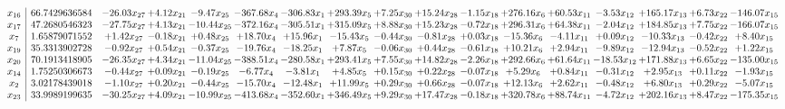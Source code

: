 \documentclass[9pt]{article}
\begin{document}
 \[\begin{array}{c| c c@{\hskip 2pt} c@{\hskip 2pt} c@{\hskip 2pt} c@{\hskip 2pt} c@{\hskip 2pt} c@{\hskip 2pt} c@{\hskip 2pt} c@{\hskip 2pt} c@{\hskip 2pt} c@{\hskip 2pt} c@{\hskip 2pt} c@{\hskip 2pt} c@{\hskip 2pt} c@{\hskip 2pt} c@{\hskip 2pt} }
 x_{16}   &  66.7429636584 & -26.03 x_{27} & +  4.12 x_{21} & -9.47 x_{25} & -367.68 x_{4} & -306.83 x_{1} & + 293.39 x_{5} & +  7.25 x_{30} & + 15.24 x_{28} & -1.15 x_{18} & + 276.16 x_{6} & + 60.53 x_{11} & -3.53 x_{12} & + 165.17 x_{13} & +  6.73 x_{22} & -146.07 x_{15}\\
 x_{17}   &  47.2680546323 & -27.75 x_{27} & +  4.13 x_{21} & -10.44 x_{25} & -372.16 x_{4} & -305.51 x_{1} & + 315.09 x_{5} & +  8.88 x_{30} & + 15.23 x_{28} & -0.72 x_{18} & + 296.31 x_{6} & + 64.38 x_{11} & -2.04 x_{12} & + 184.85 x_{13} & +  7.75 x_{22} & -166.07 x_{15}\\
 x_{7}   &  1.65879071552 & +  1.42 x_{27} & -0.18 x_{21} & +  0.48 x_{25} & + 18.70 x_{4} & + 15.96 x_{1} & -15.43 x_{5} & -0.44 x_{30} & -0.81 x_{28} & +  0.03 x_{18} & -15.36 x_{6} & -4.11 x_{11} & +  0.09 x_{12} & -10.33 x_{13} & -0.42 x_{22} & +  8.40 x_{15}\\
 x_{19}   &  35.3313902728 & -0.92 x_{27} & +  0.54 x_{21} & -0.37 x_{25} & -19.76 x_{4} & -18.25 x_{1} & +  7.87 x_{5} & -0.06 x_{30} & +  0.44 x_{28} & -0.61 x_{18} & + 10.21 x_{6} & +  2.94 x_{11} & -9.89 x_{12} & -12.94 x_{13} & -0.52 x_{22} & +  1.22 x_{15}\\
 x_{20}   &  70.1913418905 & -26.35 x_{27} & +  4.34 x_{21} & -11.04 x_{25} & -388.51 x_{4} & -280.58 x_{1} & + 293.41 x_{5} & +  7.55 x_{30} & + 14.82 x_{28} & -2.26 x_{18} & + 292.66 x_{6} & + 61.64 x_{11} & -18.53 x_{12} & + 171.88 x_{13} & +  6.65 x_{22} & -135.00 x_{15}\\
 x_{14}   &  1.75250306673 & -0.44 x_{27} & +  0.09 x_{21} & -0.19 x_{25} & -6.77 x_{4} & -3.81 x_{1} & +  4.85 x_{5} & +  0.15 x_{30} & +  0.22 x_{28} & -0.07 x_{18} & +  5.29 x_{6} & +  0.84 x_{11} & -0.31 x_{12} & +  2.95 x_{13} & +  0.11 x_{22} & -1.93 x_{15}\\
 x_{2}   &  3.02178439018 & -1.10 x_{27} & +  0.20 x_{21} & -0.44 x_{25} & -15.70 x_{4} & -12.48 x_{1} & + 11.99 x_{5} & +  0.29 x_{30} & +  0.66 x_{28} & -0.07 x_{18} & + 12.13 x_{6} & +  2.62 x_{11} & -0.48 x_{12} & +  6.80 x_{13} & +  0.29 x_{22} & -5.07 x_{15}\\
 x_{23}   &  33.9989199635 & -30.25 x_{27} & +  4.09 x_{21} & -10.99 x_{25} & -413.68 x_{4} & -352.60 x_{1} & + 346.49 x_{5} & +  9.29 x_{30} & + 17.47 x_{28} & -0.18 x_{18} & + 320.78 x_{6} & + 88.74 x_{11} & -4.72 x_{12} & + 202.16 x_{13} & +  8.47 x_{22} & -175.35 x_{15}\\

\end{array}\]
\end{document}
